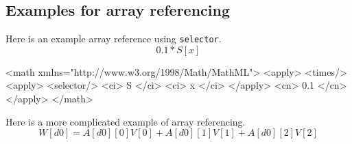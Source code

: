 \subsection{Examples for array referencing}

Here is an example array reference using {\tt selector}.
\begin{displaymath}
0.1 * S[x]
\end{displaymath}
\begin{example}
<math xmlns="http://www.w3.org/1998/Math/MathML">
    <apply>
        <times/>
        <apply>
            <selector/>
            <ci> S </ci>
            <ci> x </ci>
        </apply>
        <cn> 0.1 </cn>
    </apply>
</math>


\end{example}

Here is a more complicated example of array referencing.
\begin{displaymath}
W[d0]= A[d0][0]V[0]+ A[d0][1]V[1]+ A[d0][2]V[2]
\end{displaymath}

